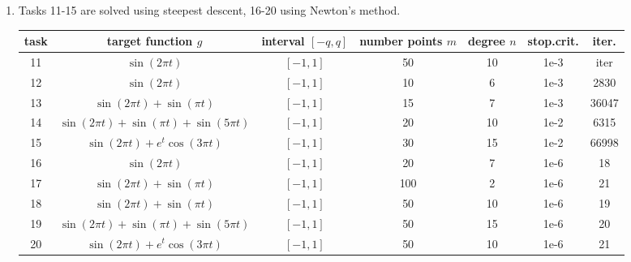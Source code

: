 \documentclass[12pt, a4paper, parskip=half]{scrartcl}
\newcommand{\problem}{\clearpage\item}
\begin{document}
\begin{enumerate}[leftmargin=0.5cm, label=(\roman*)]
        \problem %
        Tasks 11-15 are solved using steepest descent, 16-20 using Newton's method.

        \begin{table}[!ht]
            \begin{adjustbox}{angle=90}
                \begin{tabular}{|| c | c | c | c | c | c | c ||} 
                    \hline
                    task & target function $g$ & interval $[-q, q]$ & number points $m$ & degree $n$ & stop.crit. & iter. \\ [0.5ex] 
                    \hline\hline
                    11 & $\sin(2 \pi t)$ & $[-1, 1]$ & 50 & 10 & 1e-3 & iter \\
                    \hline
                    12 & $\sin(2 \pi t)$ & $[-1, 1]$ & 10 & 6 & 1e-3 & 2830 \\
                    \hline
                    13 & $\sin(2 \pi t) + \sin(\pi t)$ & $[-1, 1]$ & 15 & 7 & 1e-3 & 36047 \\
                    \hline
                    14 & $\sin(2 \pi t) + \sin(\pi t) + \sin(5 \pi t)$ & $[-1, 1]$ & 20 & 10 & 1e-2 & 6315 \\
                    \hline
                    15 & $\sin(2 \pi t) + e^{t} \cos(3 \pi t)$ & $[-1, 1]$ & 30 & 15 & 1e-2 & 66998 \\
                    \hline\hline
                    16 & $\sin(2 \pi t)$ & $[-1, 1]$ & 20 & 7 & 1e-6 & 18 \\
                    \hline
                    17 & $\sin(2 \pi t) + \sin(\pi t)$ & $[-1, 1]$ & 100 & 2 & 1e-6 & 21 \\
                    \hline
                    18 & $\sin(2 \pi t) + \sin(\pi t)$ & $[-1, 1]$ & 50 & 10 & 1e-6 & 19 \\
                    \hline
                    19 & $\sin(2 \pi t) + \sin(\pi t) + \sin(5 \pi t)$ & $[-1, 1]$ & 50 & 15 & 1e-6 & 20 \\
                    \hline
                    20 & $\sin(2 \pi t) + e^{t} \cos(3 \pi t)$ & $[-1, 1]$ & 50 & 10 & 1e-6 & 21 \\ [1ex] 
                    \hline
                \end{tabular}
            \end{adjustbox}
        \end{table}


\end{enumerate}
\end{document}
